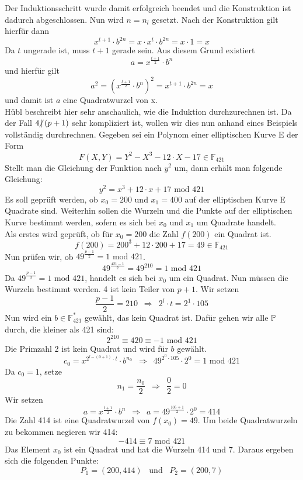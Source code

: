 Der Induktionsschritt wurde damit erfolgreich beendet und die Konstruktion ist dadurch abgeschlossen. Nun wird $n = n_l$ gesetzt. Nach der Konstruktion gilt hierfür dann $$x^{t+1} \cdot b^{2n} = x \cdot x^t \cdot b^{2n} = x \cdot 1 = x$$ Da $t$ ungerade ist, muss $t + 1$ gerade sein. Aus diesem Grund existiert $$a = x^{\frac{t + 1}{2}} \cdot b^n$$ und hierfür gilt $$a^2 = {(x^{\frac{t + 1}{2}} \cdot b^n)}^2 = x^{t + 1} \cdot b^{2n} = x$$ und damit ist $a$ eine Quadratwurzel von x.\\

Hübl beschreibt hier sehr anschaulich, wie die Induktion durchzurechnen ist. Da der Fall $4 \hspace{-0.4em}\not\hspace{0.025em}|\, (p + 1)$ sehr kompliziert ist, wollen wir dies nun anhand eines Beispiels vollständig durchrechnen. Gegeben sei ein Polynom einer elliptischen Kurve E der Form $$F(X, Y) = Y^{2} - X^{3} - 12 \cdot X - 17 \in \mathbb{F}_{421}$$ Stellt man die Gleichung der Funktion nach $y^{2}$ um, dann erhält man folgende Gleichung: $$y^{2} =  x^{3} + 12 \cdot x + 17 \text{ mod }421$$ Es soll geprüft werden, ob $x_0 = 200$ und $x_1 = 400$ auf der elliptischen Kurve E Quadrate sind. Weiterhin sollen die Wurzeln und die Punkte auf der elliptischen Kurve bestimmt werden, sofern es sich bei $x_0$ und $x_1$ um Quadrate handelt.\\

Als erstes wird geprüft, ob für $x_0 = 200$ die Zahl $f(200)$ ein Quadrat ist. $$f(200) =  200^{3} + 12 \cdot 200 + 17 = 49 \in \mathbb{F}_{421}$$ Nun prüfen wir, ob $49^{\frac{p - 1}{2}} = 1 \text{ mod } 421$. $$49^{\frac{421 - 1}{2}} = 49^{210} = 1 \text{ mod } 421$$ Da $49^{\frac{p - 1}{2}} = 1 \text{ mod } 421$, handelt es sich bei $x_0$ um ein Quadrat. Nun müssen die Wurzeln bestimmt werden. 4 ist kein Teiler von $p + 1$. Wir setzen $$\frac{p - 1}{2} = 210 \enspace \Longrightarrow \enspace 2^l \cdot t = 2^1 \cdot 105$$ Nun wird ein $b \in \mathbb{F}_{421}^*$ gewählt, das kein Quadrat ist. Dafür gehen wir alle $\mathbb{P}$ durch, die kleiner als 421 sind: $$2^{210} \equiv 420 \equiv - 1 \text{ mod } 421$$ Die Primzahl 2 ist kein Quadrat und wird für $b$ gewählt. $$c_0 = x^{2^{l - (0 + 1)} \cdot t} \cdot b^{n_0} \enspace \Longrightarrow \enspace 49^{2^{0} \cdot 105} \cdot 2^0 = 1 \text{ mod } 421$$ Da $c_0 = 1$, setze $$n_{1} = \frac{n_0}{2} \enspace \Longrightarrow \enspace \frac{0}{2} = 0$$ Wir setzen $$a = x^{\frac{t + 1}{2}} \cdot b^n  \enspace \Longrightarrow \enspace a = 49^{\frac{105 + 1}{2}} \cdot 2^0 = 414$$ Die Zahl 414 ist eine Quadratwurzel von $f(x_0) = 49$. Um beide Quadratwurzeln zu bekommen negieren wir 414: $$- 414 \equiv 7 \text{ mod } 421$$ Das Element $x_0$ ist ein Quadrat und hat die Wurzeln 414 und 7. Daraus ergeben sich die folgenden Punkte: $$P_1 = (200, 414) \enspace \text{ und } \enspace P_2 = (200, 7)$$

